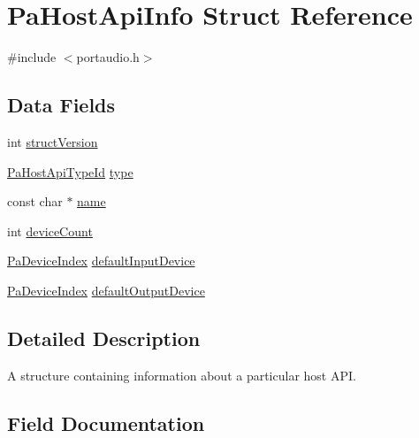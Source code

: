 \hypertarget{struct_pa_host_api_info}{}\section{Pa\+Host\+Api\+Info Struct Reference}
\label{struct_pa_host_api_info}


{\ttfamily \#include $<$portaudio.\+h$>$}

\subsection*{Data Fields}
\begin{DoxyCompactItemize}
\item 
int \hyperlink{struct_pa_host_api_info_a427b2098449590745eb8e4443f0b4ef8}{struct\+Version}
\item 
\hyperlink{portaudio_8h_a8eaebe3d39c5ea45598da8f86dc2e5ae}{Pa\+Host\+Api\+Type\+Id} \hyperlink{struct_pa_host_api_info_add416e1a2544c70972c8ce82db481a1f}{type}
\item 
const char $\ast$ \hyperlink{struct_pa_host_api_info_a8f8f80d37794cde9472343e4487ba3eb}{name}
\item 
int \hyperlink{struct_pa_host_api_info_aeae4d6852439dcd029768b91adabc33b}{device\+Count}
\item 
\hyperlink{portaudio_8h_ad79317e65bde63d76c4b8e711ac5a361}{Pa\+Device\+Index} \hyperlink{struct_pa_host_api_info_a6c681fefd6f05bbef73a6d5517ceec4d}{default\+Input\+Device}
\item 
\hyperlink{portaudio_8h_ad79317e65bde63d76c4b8e711ac5a361}{Pa\+Device\+Index} \hyperlink{struct_pa_host_api_info_a9bd363301c00185c3da6e7c325c132e5}{default\+Output\+Device}
\end{DoxyCompactItemize}


\subsection{Detailed Description}
A structure containing information about a particular host A\+PI. 

\subsection{Field Documentation}
\mbox{\label{struct_pa_host_api_info_a6c681fefd6f05bbef73a6d5517ceec4d}} 
